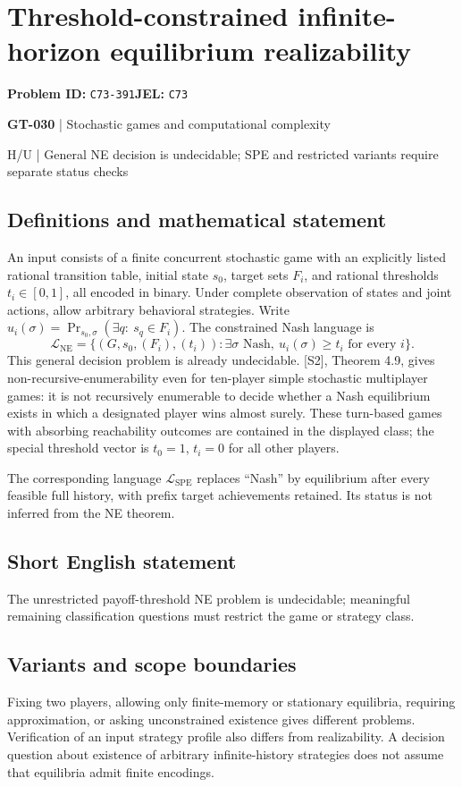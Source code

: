 \documentclass[11pt,a4paper]{article}
\begin{document}
\section*{Threshold-constrained infinite-horizon equilibrium realizability}
\textbf{Problem ID:} \texttt{C73-391}\quad \textbf{JEL:} \texttt{C73}\par
\label{problem:OP-0160}
\label{game:GT-030}
{\sffamily\small\color{muted}
{\sffamily\small\color{muted}\textbf{GT-030} | Stochastic games and computational complexity\par H/U | General NE decision is undecidable; SPE and restricted variants require separate status checks\par}
\par}
\subsection*{Definitions and mathematical statement}
An input consists of a finite concurrent stochastic game with an explicitly listed rational transition table, initial state $s_0$, target sets $F_i$, and rational thresholds $t_i\in[0,1]$, all encoded in binary. Under complete observation of states and joint actions, allow arbitrary behavioral strategies. Write $u_i(\sigma)=\Pr_{s_0,\sigma}(\exists q:\ s_q\in F_i)$. The constrained Nash language is
\[
 \mathcal L_{\mathrm{NE}}=
 \{(G,s_0,(F_i),(t_i)):\exists\sigma\text{ Nash},\ 
 u_i(\sigma)\geq t_i\text{ for every }i\}.
\]
This general decision problem is already undecidable. [S2], Theorem 4.9, gives non-recursive-enumerability even for ten-player simple stochastic multiplayer games: it is not recursively enumerable to decide whether a Nash equilibrium exists in which a designated player wins almost surely. These turn-based games with absorbing reachability outcomes are contained in the displayed class; the special threshold vector is $t_0=1$, $t_i=0$ for all other players.

The corresponding language $\mathcal L_{\mathrm{SPE}}$ replaces ``Nash'' by equilibrium after every feasible full history, with prefix target achievements retained. Its status is not inferred from the NE theorem.
\subsection*{Short English statement}
The unrestricted payoff-threshold NE problem is undecidable; meaningful remaining classification questions must restrict the game or strategy class.
\subsection*{Variants and scope boundaries}
Fixing two players, allowing only finite-memory or stationary equilibria, requiring approximation, or asking unconstrained existence gives different problems. Verification of an input strategy profile also differs from realizability. A decision question about existence of arbitrary infinite-history strategies does not assume that equilibria admit finite encodings.
\end{document}
